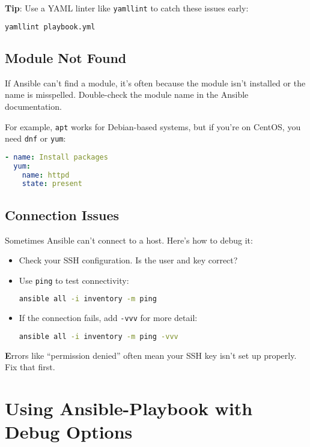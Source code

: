 \textbf{Tip}: Use a YAML linter like \texttt{yamllint} to catch these issues early:
\begin{lstlisting}[language=bash, caption=Using yamllint]
yamllint playbook.yml
\end{lstlisting}

\subsection{Module Not Found}

If Ansible can't find a module, it's often because the module isn't installed or the name is misspelled. Double-check the module name in the Ansible documentation.

For example, \texttt{apt} works for Debian-based systems, but if you're on CentOS, you need \texttt{dnf} or \texttt{yum}:
\begin{lstlisting}[language=yaml, caption=Correct Module for CentOS]
- name: Install packages
  yum:
    name: httpd
    state: present
\end{lstlisting}

\subsection{Connection Issues}

Sometimes Ansible can't connect to a host. Here's how to debug it:
\begin{itemize}
    \item Check your SSH configuration. Is the user and key correct?
    \item Use \texttt{ping} to test connectivity:
    \begin{lstlisting}[language=bash, caption=Testing Connectivity]
ansible all -i inventory -m ping
    \end{lstlisting}
    \item If the connection fails, add \texttt{-vvv} for more detail:
    \begin{lstlisting}[language=bash, caption=Verbose Output]
ansible all -i inventory -m ping -vvv
    \end{lstlisting}
\end{itemize}

\textbf{E}rrors like “permission denied” often mean your SSH key isn't set up properly. Fix that first.


\section{Using Ansible-Playbook with Debug Options}

